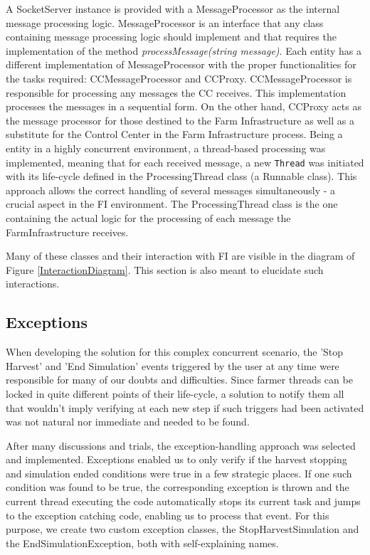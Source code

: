 \documentclass[12pt]{article}
\begin{document}
A SocketServer instance is provided with a MessageProcessor as the internal message processing logic.
MessageProcessor is an interface that any class containing message processing logic should implement and that requires the implementation of the method 
\textit{processMessage(string message)}. 
Each entity has a different implementation of MessageProcessor with the proper functionalities for the tasks required: CCMessageProcessor and CCProxy.
CCMessageProcessor is responsible for processing any messages the CC receives. 
This implementation processes the messages in a sequential form.
On the other hand, CCProxy acts as the message processor for those destined to the Farm Infrastructure as well as a substitute for the Control Center in the 
Farm Infrastructure process. 
Being a entity in a highly concurrent environment, a thread-based processing was implemented, meaning that for each received message, a new \texttt{Thread} was 
initiated with its life-cycle defined in the ProcessingThread class (a Runnable class). 
This approach allows the correct handling of several messages simultaneously - a crucial aspect in the FI environment. 
The ProcessingThread class is the one containing the actual logic for the processing of each message the FarmInfrastructure receives.

Many of these classes and their interaction with FI are visible in the diagram of Figure \ref{InteractionDiagram}.
This section is also meant to elucidate such interactions.

\subsection{Exceptions} %

When developing the solution for this complex concurrent scenario, the 'Stop Harvest' and 'End Simulation' events triggered by the user at any time were 
responsible for many of our doubts and difficulties.
Since farmer threads can be locked in quite different points of their life-cycle, a solution to notify them all that wouldn't imply verifying at each new step 
if such triggers had been activated was not natural nor immediate and needed to be found.

After many discussions and trials, the exception-handling approach was selected and implemented. 
Exceptions enabled us to only verify if the harvest stopping and simulation ended conditions were true in a few strategic places.
If one such condition was found to be true, the corresponding exception is thrown and the current thread executing the code automatically stops its current task 
and jumps to the exception catching code, enabling us to process that event. 
For this purpose, we create two custom exception classes, the StopHarvestSimulation and the EndSimulationException, both with self-explaining names.
\end{document}
